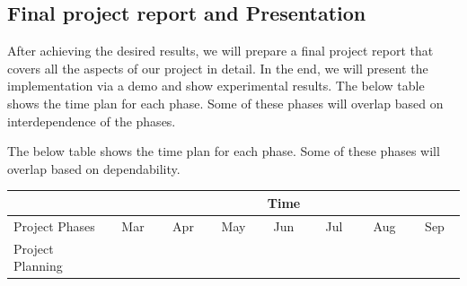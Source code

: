 \documentclass[titlepage]{report}
\begin{document}
\subsection{Final project report and Presentation}
After achieving the desired results, we will prepare a final project report that covers all the aspects of our project in detail. In the end, we will present the implementation via a demo and show experimental results. The below table shows the time plan for each phase. Some of these phases will overlap based on interdependence of the phases. 

The below table shows the time plan for each phase. Some of these phases will overlap based on dependability.



\begin{table}[ht]
\begin{adjustbox}{width=1.3\textwidth}
\begin{tabular}{|l|l|l|l|l|l|l|l|l|l|l|l|l|l|l|l|l|l|l|l|l|l|l|l|l|l|l|l|l|}
\hline
                                             & \multicolumn{28}{c|}{Time}                                                                                                                                                                                                                                                                                                                                                                                                                                                                                                                                                                                                                                                        \\ \hline
Project Phases                               & \multicolumn{4}{c|}{Mar}                                  & \multicolumn{4}{c|}{Apr}                                                                                  & \multicolumn{4}{c|}{May}                                                                                  & \multicolumn{4}{c|}{Jun}                                                                                  & \multicolumn{4}{c|}{Jul}                                                                                  & \multicolumn{4}{c|}{Aug}                                                                                  & \multicolumn{4}{c|}{Sep}                                  \\ \hline
Project Planning                             &  &  & \cellcolor[HTML]{32CB00} & \cellcolor[HTML]{32CB00} &                          &                          &                          &                          &                          &                          &                          &                          &                          &                          &                          &                          &                          &                          &                          &                          &                          &                          &                          &                          &                          &                          &  &  \\ \hline

\end{tabular}
\end{adjustbox}
\end{table}
\end{document}
